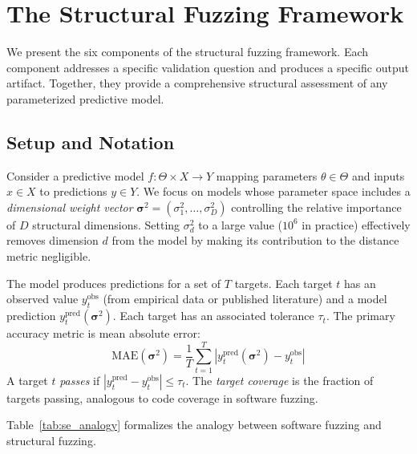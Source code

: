 \documentclass[manuscript,review,anonymous]{acmart}
\newcommand{\MAE}{\mathrm{MAE}}
\begin{document}
\section{The Structural Fuzzing Framework}
\label{sec:framework}

We present the six components of the structural fuzzing framework.
Each component addresses a specific validation question and produces a specific output artifact.
Together, they provide a comprehensive structural assessment of any parameterized predictive model.

\subsection{Setup and Notation}

Consider a predictive model $f: \Theta \times X \to Y$ mapping parameters $\theta \in \Theta$ and inputs $x \in X$ to predictions $y \in Y$.
We focus on models whose parameter space includes a \emph{dimensional weight vector} $\boldsymbol{\sigma}^2 = (\sigma_1^2, \ldots, \sigma_D^2)$ controlling the relative importance of $D$ structural dimensions.
Setting $\sigma_d^2$ to a large value ($10^6$ in practice) effectively removes dimension $d$ from the model by making its contribution to the distance metric negligible.

The model produces predictions for a set of $T$ targets.
Each target $t$ has an observed value $y_t^{\mathrm{obs}}$ (from empirical data or published literature) and a model prediction $y_t^{\mathrm{pred}}(\boldsymbol{\sigma}^2)$.
Each target has an associated tolerance $\tau_t$.
The primary accuracy metric is mean absolute error:
\begin{equation}
    \MAE(\boldsymbol{\sigma}^2) = \frac{1}{T} \sum_{t=1}^{T} |y_t^{\mathrm{pred}}(\boldsymbol{\sigma}^2) - y_t^{\mathrm{obs}}|
    \label{eq:mae}
\end{equation}
A target $t$ \emph{passes} if $|y_t^{\mathrm{pred}} - y_t^{\mathrm{obs}}| \leq \tau_t$.
The \emph{target coverage} is the fraction of targets passing, analogous to code coverage in software fuzzing.

Table~\ref{tab:se_analogy} formalizes the analogy between software fuzzing and structural fuzzing.
\end{document}
